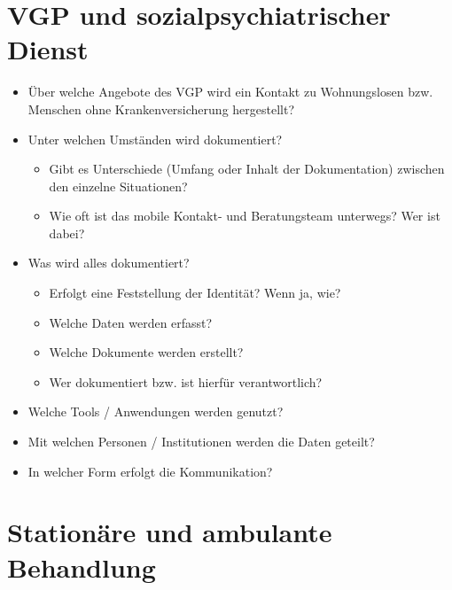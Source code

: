 \newpage

\section{VGP und sozialpsychiatrischer Dienst}

\begin{itemize}
	\item Über welche Angebote des VGP wird ein Kontakt zu Wohnungslosen bzw. Menschen ohne Krankenversicherung hergestellt?
	\item Unter welchen Umständen wird dokumentiert?
	\begin{itemize}
		\item Gibt es Unterschiede (Umfang oder Inhalt der Dokumentation) zwischen den einzelne Situationen?
		\item Wie oft ist das mobile Kontakt- und Beratungsteam unterwegs? Wer ist dabei?
	\end{itemize}
	\item Was wird alles dokumentiert?
	\begin{itemize}
		\item Erfolgt eine Feststellung der Identität? Wenn ja, wie?
		\item Welche Daten werden erfasst?
		\item Welche Dokumente werden erstellt?
		\item Wer dokumentiert bzw. ist hierfür verantwortlich?
	\end{itemize}
	\item Welche Tools / Anwendungen werden genutzt?
	\item Mit welchen Personen / Institutionen werden die Daten geteilt?
	\item In welcher Form erfolgt die Kommunikation?
\end{itemize}

\newpage

\section{Stationäre und ambulante Behandlung}


